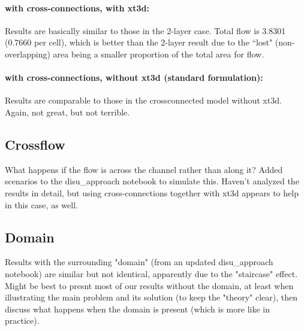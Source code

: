 \documentclass{article}
\begin{document}
\paragraph{with cross-connections, with xt3d:} Results are basically similar to those in the 2-layer case. Total flow is 3.8301 (0.7660 per cell), which is better than the 2-layer result due to the ``lost" (non-overlapping) area being a smaller proportion of the total area for flow.

\paragraph{with cross-connections, without xt3d (standard formulation):} Results are comparable to those in the crossconnected model without xt3d. Again, not great, but not terrible.

\subsection{Crossflow}
What happens if the flow is across the channel rather than along it? Added scenarios to the disu\_approach notebook to simulate this. Haven't analyzed the results in detail, but using cross-connections together with xt3d appears to help in this case, as well.

\subsection{Domain}
Results with the surrounding "domain" (from an updated disu\_approach notebook) are similar but not identical, apparently due to the "staircase" effect. Might be best to presnt most of our results without the domain, at least when illustrating the main problem and its solution (to keep the "theory" clear), then discuss what happens when the domain is present (which is more like in practice).
\end{document}
